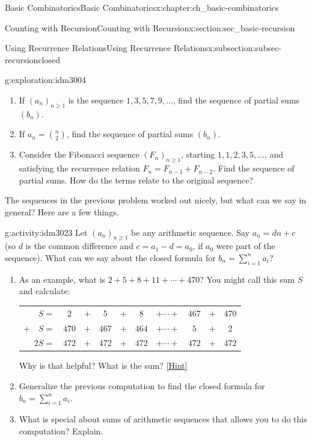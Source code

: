 \documentclass[oneside,10pt,]{book}
\numberwithin{equation}{chapter}
\newcommand{\hrulethin}  {\noalign{\hrule height 0.04em}}
\begin{document}
\begin{chapterptx}{Basic Combinatorics}{}{Basic Combinatorics}{}{}{x:chapter:ch_basic-combinatorics}
\begin{sectionptx}{Counting with Recursion}{}{Counting with Recursion}{}{}{x:section:sec_basic-recursion}
\begin{subsectionptx}{Using Recurrence Relations}{}{Using Recurrence Relations}{}{}{x:subsection:subsec-recursionclosed}
\begin{exploration}{}{g:exploration:idm3004}
\begin{enumerate}[font=\bfseries,label=(\alph*),ref=\alph*]
\item{}If \((a_n)_{n \ge 1}\) is the sequence \(1, 3, 5, 7, 9, \ldots\), find the sequence of partial sums \((b_n)\).%
\item{}If \(a_n = \binom{n}{2}\), find the sequence of partial sums \((b_n)\).%
\item{}Consider the Fibonacci sequence \((F_n)_{n \ge 1}\), starting \(1, 1, 2, 3, 5, \ldots\), and satisfying the recurrence relation \(F_n = F_{n-1} + F_{n-2}\).  Find the sequence of partial sums.  How do the terms relate to the original sequence?%
\end{enumerate}
\end{exploration}
The sequences in the previous problem worked out nicely, but what can we say in general?  Here are a few things.%
\begin{activity}{}{g:activity:idm3023}%
Let \((a_n)_{n \ge 1}\) be any arithmetic sequence.  Say \(a_n = dn + c\) (so \(d\) is the common difference and \(c = a_1 - d = a_0\), if \(a_0\) were part of the sequence).  What can we say about the closed formula for \(b_n = \sum_{i=1}^n a_i\)?%
\begin{enumerate}[font=\bfseries,label=(\alph*),ref=\alph*]
\item{}As an example, what is \(2+5+8+11+\cdots + 470\)?  You might call this sum \(S\) and calculate:%
\begin{sidebyside}{1}{0}{0}{0}%
\begin{sbspanel}{1}%
{\centering%
\begin{tabular}{rccccccccc}
\(S  =\)&\(2\)&\(+\)&\(5\)&\(+\)&\(8\)&\(+ \cdots +\)&\(467\)&\(+\)&470\tabularnewline[0pt]
\(+ \quad S  =\)&\(470\)&\(+\)&\(467\)&\(+\)&\(464\)&\(+ \cdots +\)&\(5\)&\(+\)&2\tabularnewline\hrulethin
\(2S  =\)&\(472\)&\(+\)&\(472\)&\(+\)&\(472\)&\(+ \cdots +\)&\(472\)&\(+\)&\(472\)
\end{tabular}
\par}
\end{sbspanel}%
\end{sidebyside}%
\par
Why is that helpful?  What is the sum?%
\space\hspace*{0pt}\hfill{\tiny\hyperlink{g:hint:idm3111-back}{[Hint]}}\item{}Generalize the previous computation to find the closed formula for \(b_n = \sum_{i=1}^n a_i\).%
\item{}What is special about sums of arithmetic sequences that allows you to do this computation?  Explain.%

\end{enumerate}
\end{activity}
\end{subsectionptx}
\end{sectionptx}
\end{chapterptx}
\end{document}
